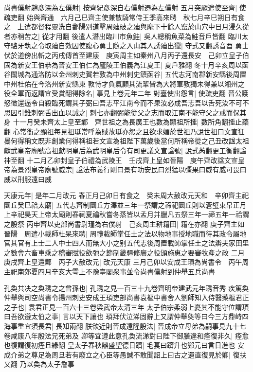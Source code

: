 尚書僕射趙彥深為左僕射|{
	按齊紀彥深自右僕射遷為左僕射}
五月突厥遣使至齊|{
	使疏吏翻}
始與齊通　六月己巳齊主使兼散騎常侍王季高來聘　秋七月辛巳朔日有食之　上遣都督程靈洗自鄱陽别道擊周廸破之廸與麾下十餘人竄於山穴中日月浸久從者亦稍苦之|{
	從才用翻}
後遣人潛出臨川市魚鮭|{
	吳人總稱魚菜為鮭音戶皆翻}
臨川太守駱牙執之令取廸自效因使腹心勇士隨之入山其人誘廸出獵|{
	守式又翻誘音酉}
勇士伏於道傍出斬之丙戌傳首至建康　庚寅周主如秦州八月丙子還長安　己卯立皇子伯固為新安王伯恭為晉安王伯仁為廬陵王伯義為江夏王|{
	夏戶雅翻}
冬十月辛亥周以函谷關城為通洛防以金州刺史賀若敦為中州刺史鎮函谷|{
	五代志河南郡新安縣後周置中州杜佑在今洛州新安縣東}
敦恃才負氣顧其流輩皆為大將軍敦獨未得兼以湘州之役全軍而返謂宜受賞翻得除名|{
	事見上卷元年二年}
對臺使出怨言|{
	使疏吏翻}
晉公護怒徵還逼令自殺臨死謂其子弼曰吾志平江南今而不果汝必成吾志吾以舌死汝不可不思因引錐刺弼舌出血以誡之|{
	刺七亦翻弼能從父之志而取江南不能守父之戒而保其身}
十一月癸未齊太上皇至鄴　齊世祖之為長廣王也數為顯祖所捶|{
	數所角翻捶止蘃翻}
心常銜之顯祖每見祖珽常呼為賊故珽亦怨之且欲求媚於世祖乃說世祖曰文宣狂㬥何得稱文既非創業何得稱祖若文宣為祖陛下萬歲後當何所稱帝從之己丑改諡太祖獻武皇帝廟號高祖獻明皇后為武明皇后令有司更議文宣諡號|{
	說式芮翻更工衡翻諡神至翻}
十二月乙卯封皇子伯禮為武陵王　壬戌齊上皇如晉陽　庚午齊改諡文宣皇帝為景烈皇帝廟號威宗|{
	諡法布義行剛曰景有功安民曰烈猛以彊果曰威有威可畏曰威以刑服遠曰威}


天康元年|{
	是年二月改元}
春正月己卯日有食之　癸未周大赦改元天和　辛卯齊主祀圜丘癸巳祫太廟|{
	五代志齊制圜丘方澤並三年一祭謂之禘祀圜丘則以蒼璧束帛正月上辛祀昊天上帝太廟則春祠夏禴秋嘗冬蒸皆以孟月并臘凡五祭三年一禘五年一祫謂之殷祭}
丙申齊以吏部尚書尉瑾為右僕射　己亥周主耕籍田|{
	籍在亦翻}
庚子齊主如晉陽　周遣小載師杜杲來聘|{
	周禮載師掌任土之法以物地事授地職而待其政令屬地官其官有上士二人中士四人而無大小之别五代志後周置載師掌任土之法辯夫家田里之數會六畜車乘之稽審賦役歛弛之節制畿疆修廣之役頒施惠之要審牧產之政}
二月庚戌齊上皇還鄴　丙子大赦改元|{
	改元天康}
三月己卯以安成王頊為尚書令　丙午周主祀南郊夏四月辛亥大雩上不豫臺閣衆事並令尚書僕射到仲舉五兵尚書

孔奐共决之奐琇之之曾孫也|{
	孔琇之見一百三十九卷齊明帝建武元年琇音秀}
疾篤奐仲舉與司空尚書令揚州刺史安成王頊吏部尚書袁樞中書舍人劉師知入侍醫藥樞君正之子也|{
	袁君正見一百六十三卷梁武帝太清三年}
太子伯宗柔弱上憂其不能守位謂頊曰吾欲遵太伯之事|{
	言以天下讓也}
頊拜伏泣涕固辭上又謂仲舉奐等曰今三方鼎峙四海事重宜須長君|{
	長知兩翻}
朕欲近則晉成遠隆殷法|{
	晉成帝立母弟為嗣事見九十七卷咸康八年殷法兄死弟及}
卿等宜遵此意孔奐流涕對曰陛下御膳違和痊復非久|{
	痊愈也復謂復初痊且緣翻}
皇太子春秋鼎盛聖德日躋|{
	毛萇曰躋升也鄭元曰言日進也}
安成介弟之尊足為周旦若有廢立之心臣等愚誠不敢聞詔上曰古之遺直復見於卿|{
	復扶又翻}
乃以奐為太子詹事

